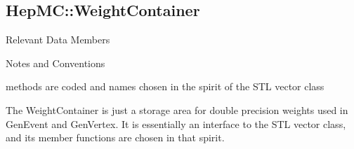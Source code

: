 \documentclass[11pt,letterpaper]{article}
\begin{document}
%
%

\subsection{HepMC::WeightContainer}
\begin{myitemize}{Relevant Data Members}
\end{myitemize}
\begin{myitemize}{Notes and Conventions}
\item methods are coded and names chosen in the spirit of the
  STL vector class
\end{myitemize}

The WeightContainer is just a storage area for double precision
weights used in GenEvent and GenVertex. It is essentially an interface
to the STL vector class, and its member functions are chosen in that
spirit.

%
%
\end{document}
